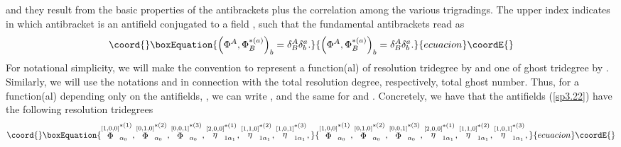 \documentclass[a4paper,12pt]{article}
\begin{document}
and they result from the basic properties of the antibrackets plus the
correlation among the various trigradings. The upper index \coordHE{} indicates
in which antibracket is an antifield \coordHE{} conjugated to a
field \coordHE{}, such that the fundamental antibrackets read as 
\begin{equation}\coord{}\boxEquation{
\left( \Phi ^{A},\Phi _{B}^{*(a)}\right) _{b}=\delta _{B}^{A}\delta _{b}^{a}.
\label{sp3.25}
}{
\left( \Phi ^{A},\Phi _{B}^{*(a)}\right) _{b}=\delta _{B}^{A}\delta _{b}^{a}.
}{ecuacion}\coordE{}\end{equation}
For notational simplicity, we will make the convention to represent a
function(al) \coordHE{} of resolution tridegree \coordHE{} by \coordHE{} and one of ghost tridegree \coordHE{} by \coordHE{}. Similarly, we will use the
notations \coordHE{} and \coordHE{} in connection with the total resolution degree,
respectively, total ghost number. Thus, for a function(al) depending only on
the antifields, \coordHE{}, we can write \coordHE{}, and the same for \coordHE{} and \coordHE{}. Concretely, we have that the antifields (\ref{sp3.22}) have
the following resolution tridegrees 
\begin{equation}\coord{}\boxEquation{
\stackrel{\left[ 1,0,0\right] }{\Phi }_{\alpha _{0}}^{*(1)},\stackrel{\left[
0,1,0\right] }{\Phi }_{\alpha _{0}}^{*(2)},\stackrel{\left[ 0,0,1\right] }{
\Phi }_{\alpha _{0}}^{*(3)},\stackrel{\left[ 2,0,0\right] }{\eta }_{1\alpha
_{1}}^{*(1)},\stackrel{\left[ 1,1,0\right] }{\eta }_{1\alpha _{1}}^{*(2)},
\stackrel{\left[ 1,0,1\right] }{\eta }_{1\alpha _{1}}^{*(3)},  \label{sp3.26}
}{
\stackrel{\left[ 1,0,0\right] }{\Phi }_{\alpha _{0}}^{*(1)},\stackrel{\left[
0,1,0\right] }{\Phi }_{\alpha _{0}}^{*(2)},\stackrel{\left[ 0,0,1\right] }{
\Phi }_{\alpha _{0}}^{*(3)},\stackrel{\left[ 2,0,0\right] }{\eta }_{1\alpha
_{1}}^{*(1)},\stackrel{\left[ 1,1,0\right] }{\eta }_{1\alpha _{1}}^{*(2)},
\stackrel{\left[ 1,0,1\right] }{\eta }_{1\alpha _{1}}^{*(3)},  }{ecuacion}\coordE{}\end{equation}
\end{document}
